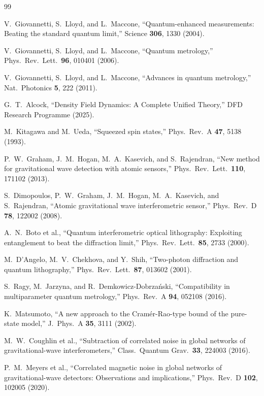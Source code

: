 \documentclass[aps,prl,twocolumn,superscriptaddress,showpacs]{revtex4-2}
\theoremstyle{definition}
\begin{document}
\begin{thebibliography}{99}

V.~Giovannetti, S.~Lloyd, and L.~Maccone,
``Quantum-enhanced measurements: Beating the standard quantum limit,''
Science \textbf{306}, 1330 (2004).

V.~Giovannetti, S.~Lloyd, and L.~Maccone,
``Quantum metrology,''
Phys.\ Rev.\ Lett.\ \textbf{96}, 010401 (2006).

V.~Giovannetti, S.~Lloyd, and L.~Maccone,
``Advances in quantum metrology,''
Nat.\ Photonics \textbf{5}, 222 (2011).

G.~T.~Alcock,
``Density Field Dynamics: A Complete Unified Theory,''
DFD Research Programme (2025).

M.~Kitagawa and M.~Ueda,
``Squeezed spin states,''
Phys.\ Rev.\ A \textbf{47}, 5138 (1993).

P.~W.~Graham, J.~M.~Hogan, M.~A.~Kasevich, and S.~Rajendran,
``New method for gravitational wave detection with atomic sensors,''
Phys.\ Rev.\ Lett.\ \textbf{110}, 171102 (2013).

S.~Dimopoulos, P.~W.~Graham, J.~M.~Hogan, M.~A.~Kasevich, and S.~Rajendran,
``Atomic gravitational wave interferometric sensor,''
Phys.\ Rev.\ D \textbf{78}, 122002 (2008).

A.~N.~Boto et al.,
``Quantum interferometric optical lithography: Exploiting entanglement
to beat the diffraction limit,''
Phys.\ Rev.\ Lett.\ \textbf{85}, 2733 (2000).

M.~D'Angelo, M.~V.~Chekhova, and Y.~Shih,
``Two-photon diffraction and quantum lithography,''
Phys.\ Rev.\ Lett.\ \textbf{87}, 013602 (2001).

S.~Ragy, M.~Jarzyna, and R.~Demkowicz-Dobrza\'nski,
``Compatibility in multiparameter quantum metrology,''
Phys.\ Rev.\ A \textbf{94}, 052108 (2016).

K.~Matsumoto,
``A new approach to the Cram\'er-Rao-type bound of the pure-state
model,''
J.\ Phys.\ A \textbf{35}, 3111 (2002).

M.~W.~Coughlin et al.,
``Subtraction of correlated noise in global networks of
gravitational-wave interferometers,''
Class.\ Quantum Grav.\ \textbf{33}, 224003 (2016).

P.~M.~Meyers et al.,
``Correlated magnetic noise in global networks of gravitational-wave
detectors: Observations and implications,''
Phys.\ Rev.\ D \textbf{102}, 102005 (2020).


\end{thebibliography}
\end{document}
